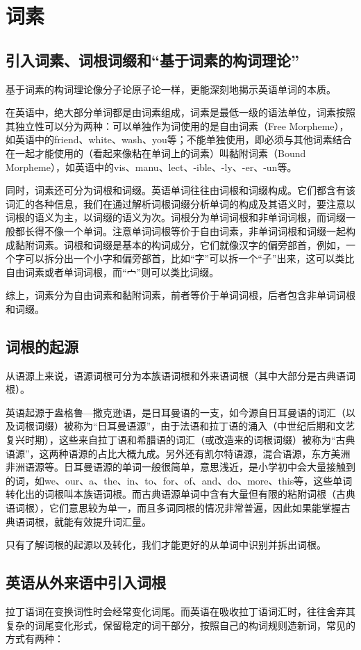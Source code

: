 \chapter{词素}
\section{引入词素、词根词缀和“基于词素的构词理论”}
基于词素的构词理论像分子论原子论一样，更能深刻地揭示英语单词的本质。

在英语中，绝大部分单词都是由词素组成，词素是最低一级的语法单位，词素按照其独立性可以分为两种：可以单独作为词使用的是自由词素（Free Morpheme），如英语中的friend、white、wash、you等；不能单独使用，即必须与其他词素结合在一起才能使用的（看起来像粘在单词上的词素）叫黏附词素（Bound Morpheme），如英语中的vis、manu、lect、-ible、-ly、-er、-un等。

同时，词素还可分为词根和词缀。英语单词往往由词根和词缀构成。它们都含有该词汇的各种信息，我们在通过解析词根词缀分析单词的构成及其语义时，要注意以词根的语义为主，以词缀的语义为次。词根分为单词词根和非单词词根，而词缀一般都长得不像一个单词。注意单词词根等价于自由词素，非单词词根和词缀一起构成黏附词素。词根和词缀是基本的构词成分，它们就像汉字的偏旁部首，例如，一个字可以拆分出一个小字和偏旁部首，比如“字”可以拆一个“子”出来，这可以类比自由词素或者单词词根，而“宀”则可以类比词缀。

综上，词素分为自由词素和黏附词素，前者等价于单词词根，后者包含非单词词根和词缀。

\section{词根的起源}
从语源上来说，语源词根可分为本族语词根和外来语词根（其中大部分是古典语词根）。

英语起源于盎格鲁---撒克逊语，是日耳曼语的一支，如今源自日耳曼语的词汇（以及词根词缀）被称为“日耳曼语源”，由于法语和拉丁语的涌入（中世纪后期和文艺复兴时期），这些来自拉丁语和希腊语的词汇（或改造来的词根词缀）被称为“古典语源”，这两种语源的占比大概九成。另外还有凯尔特语源，混合语源，东方美洲非洲语源等。日耳曼语源的单词一般很简单，意思浅近，是小学初中会大量接触到的词，如we、our、a、the、in、to、for、of、and、do、more、this等，这些单词转化出的词根叫本族语词根。而古典语源单词中含有大量但有限的粘附词根（古典语词根），它们意思较为单一，而且多词同根的情况非常普遍，因此如果能掌握古典语词根，就能有效提升词汇量。

只有了解词根的起源以及转化，我们才能更好的从单词中识别并拆出词根。

\section{英语从外来语中引入词根}
拉丁语词在变换词性时会经常变化词尾。而英语在吸收拉丁语词汇时，往往舍弃其复杂的词尾变化形式，保留稳定的词干部分，按照自己的构词规则造新词，常见的方式有两种：

